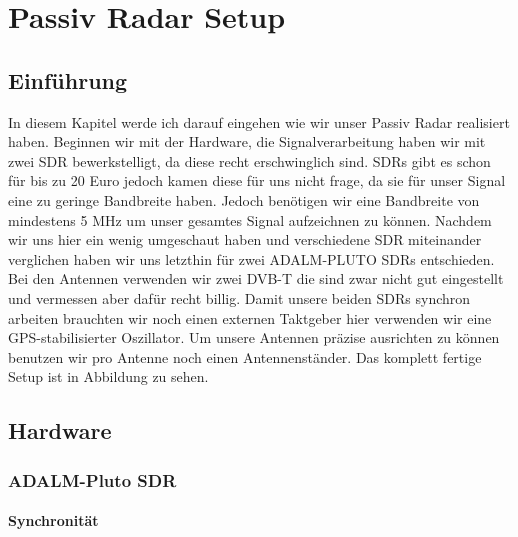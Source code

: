 \chapter{Passiv Radar Setup}
\section{Einführung}
In diesem Kapitel werde ich darauf eingehen wie wir unser Passiv Radar realisiert haben. Beginnen wir mit der Hardware, die Signalverarbeitung haben wir mit zwei SDR bewerkstelligt, da diese recht erschwinglich sind. SDRs gibt es schon für bis zu 20 Euro jedoch kamen diese für uns nicht frage, da sie für unser Signal eine zu geringe Bandbreite haben. Jedoch benötigen wir eine Bandbreite von mindestens 5 MHz um unser gesamtes Signal aufzeichnen zu können. Nachdem wir uns hier ein wenig umgeschaut haben und verschiedene SDR miteinander verglichen haben wir uns letzthin für zwei ADALM-PLUTO SDRs entschieden. Bei den Antennen verwenden wir zwei DVB-T die sind zwar nicht gut eingestellt und vermessen aber dafür recht billig. Damit unsere beiden SDRs synchron arbeiten brauchten wir noch einen externen Taktgeber hier verwenden wir eine  GPS-stabilisierter Oszillator. Um unsere Antennen präzise ausrichten zu können benutzen wir pro Antenne noch einen Antennenständer. Das komplett fertige Setup ist in Abbildung zu sehen.
\section{Hardware}
\subsection{ADALM-Pluto SDR}
\subsubsection{Synchronität}
